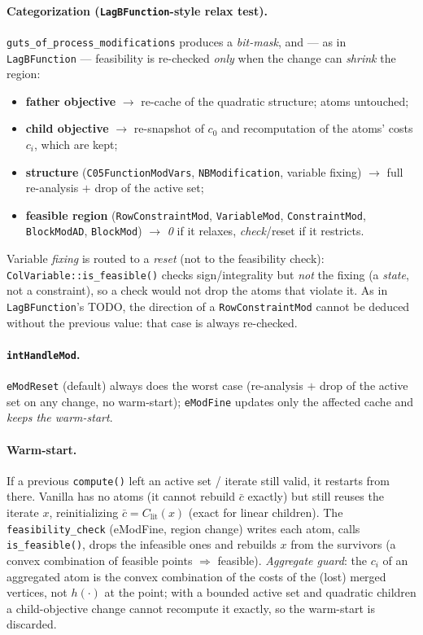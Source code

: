 \documentclass[11pt,a4paper]{article}
\newcommand{\code}[1]{\texttt{#1}}
\theoremstyle{plain}
\theoremstyle{remark}
\begin{document}
\paragraph{Categorization (\code{LagBFunction}-style relax test).}
\code{guts\_of\_process\_modifications} produces a \emph{bit-mask}, and --- as in
\code{LagBFunction} --- feasibility is re-checked \emph{only} when the change can
\emph{shrink} the region:
\begin{itemize}[nosep]
  \item \textbf{father objective} $\to$ re-cache of the quadratic structure; atoms
        untouched;
  \item \textbf{child objective} $\to$ re-snapshot of $c_0$ and recomputation of
        the atoms' costs $c_i$, which are kept;
  \item \textbf{structure} (\code{C05FunctionModVars}, \code{NBModification},
        variable fixing) $\to$ full re-analysis $+$ drop of the active set;
  \item \textbf{feasible region} (\code{RowConstraintMod}, \code{VariableMod},
        \code{ConstraintMod}, \code{BlockModAD}, \code{BlockMod}) $\to$ \emph{0} if
        it relaxes, \emph{check}/reset if it restricts.
\end{itemize}
Variable \emph{fixing} is routed to a \emph{reset} (not to the feasibility check):
\code{ColVariable::is\_feasible()} checks sign/integrality but \emph{not} the
fixing (a \emph{state}, not a constraint), so a check would not drop the atoms
that violate it. As in \code{LagBFunction}'s TODO, the direction of a
\code{RowConstraintMod} cannot be deduced without the previous value: that case is
always re-checked.

\paragraph{\code{intHandleMod}.}
\code{eModReset} (default) always does the worst case (re-analysis $+$ drop of the
active set on any change, no warm-start); \code{eModFine} updates only the affected
cache and \emph{keeps the warm-start}.

\paragraph{Warm-start.} If a previous \code{compute()} left an active set / iterate
still valid, it restarts from there. Vanilla has no atoms (it cannot rebuild
$\bar c$ exactly) but still reuses the iterate $x$, reinitializing
$\bar c = C_{\mathrm{lit}}(x)$ (exact for linear children). The
\code{feasibility\_check} (eModFine, region change) writes each atom, calls
\code{is\_feasible()}, drops the infeasible ones and rebuilds $x$ from the
survivors (a convex combination of feasible points $\Rightarrow$ feasible).
\emph{Aggregate guard}: the $c_i$ of an aggregated atom is the convex combination
of the costs of the (lost) merged vertices, not $h(\cdot)$ at the point; with a
bounded active set and quadratic children a child-objective change cannot recompute
it exactly, so the warm-start is discarded.
\end{document}
